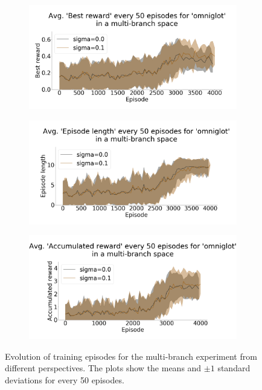 \begin{figure}[ht]
\centering
\begin{subfigure}{.40\textwidth}
  \centering
      \includegraphics[width=\linewidth]{imgs/multibranch/average-best_reward-omniglot.png}
  \caption{}
  \label{fig:results:exp3:evolution:a}
\end{subfigure}%
\begin{subfigure}{.40\textwidth}
  \centering
      \includegraphics[width=\linewidth]{imgs/multibranch/average-ep_length-omniglot.png}
  \caption{}
  \label{fig:results:exp3:evolution:b}
\end{subfigure}
\begin{subfigure}{.40\textwidth}
  \centering
      \includegraphics[width=\linewidth]{imgs/multibranch/average-acc_reward-omniglot.png}
  \caption{}
\label{fig:results:exp3:evolution:c}
\end{subfigure}
\caption{Evolution of training episodes for the multi-branch experiment from different perspectives. The plots show the means and $\pm 1$ standard deviations for every 50 episodes.}
\label{fig:results:exp3:evolution}
\vspace{-0.5cm}
\end{figure}

